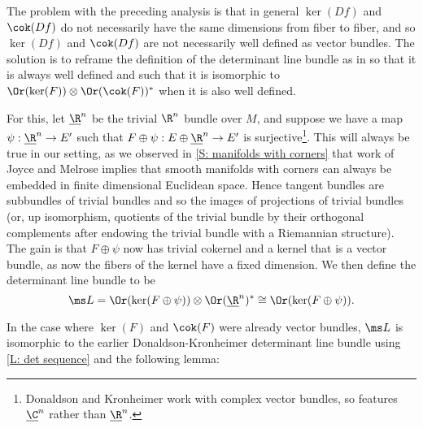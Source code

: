 The problem with the preceding analysis is that in general $\ker(Df)$ and $\cok(Df)$ do not necessarily have the same dimensions from fiber to fiber, and so $\ker(Df)$ and $\cok(Df)$ are not necessarily well defined as vector bundles. The solution is to reframe the definition of the determinant line bundle as in \cite{DoKr90} so that it is always well defined and such that it is isomorphic to $\Or(\ker(F))\otimes \Or(\cok(F))^*$ when it is also well defined. 

For this, let $\underline{\R}^n$ be the trivial $\R^n$ bundle over $M$, and suppose we have a map $\psi:\underline{\R}^n\to E'$ such that $F\oplus \psi:E\oplus \underline{\R}^n\to E'$ is surjective\footnote{Donaldson and Kronheimer work with complex vector bundles, so \cite{DoKr90} features $\underline{\C}^n$ rather than $\underline{\R}^n$.}. This will always be true in our setting, as we observed in \cref{S: manifolds with corners} that work of Joyce and Melrose implies that smooth manifolds with corners can always be embedded in finite dimensional Euclidean space. Hence tangent bundles are subbundles of trivial bundles and so the images of projections of trivial bundles (or, up isomorphism, quotients of the trivial bundle by their orthogonal complements after endowing the trivial bundle with a Riemannian structure). The gain is that $F\oplus \psi$ now has trivial cokernel and a kernel that is a vector bundle, as now the fibers of the kernel have a fixed dimension. We then define the determinant line bundle to be  $$\ms L=\Or(\ker(F\oplus \psi))\otimes \Or(\underline{\R}^n)^*\cong \Or(\ker(F\oplus \psi)).$$ 

In the case where $\ker(F)$ and $\cok(F)$ were already vector bundles, $\ms L$ is isomorphic to the earlier Donaldson-Kronheimer determinant line bundle  using \cref{L: det sequence} and the following lemma: 

